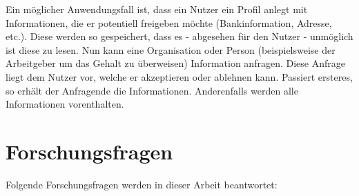 Ein möglicher Anwendungsfall ist, dass ein Nutzer ein Profil anlegt mit Informationen, die er potentiell freigeben möchte (Bankinformation, Adresse, etc.). Diese werden so gespeichert, dass es - abgesehen für den Nutzer - unmöglich ist diese zu lesen. Nun kann eine Organisation oder Person (beispielsweise der Arbeitgeber um das Gehalt zu überweisen) Information anfragen. Diese Anfrage liegt dem Nutzer vor, welche er akzeptieren oder ablehnen kann. Passiert ersteres, so erhält der Anfragende die Informationen. Anderenfalls werden alle Informationen vorenthalten.

\section{Forschungsfragen}
Folgende Forschungsfragen werden in dieser Arbeit beantwortet:

